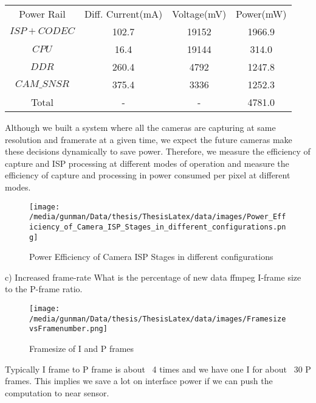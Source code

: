 		\begin{tabular}{c|c|c|c}
			Power Rail  & Diff. Current(mA) & Voltage(mV) & Power(mW)   \\
			$ISP+CODEC$ & 102.7             & 19152       & 1966.9      \\
			$CPU$ & 16.4              & 19144       & 314.0       \\
			$DDR$ & 260.4             & 4792        & 1247.8      \\
			$CAM\_SNSR$ & 375.4             & 3336        & 1252.3      \\
			Total       & -                 & -           & 4781.0      \\
		\end{tabular} \newline
		
		Although we built a system where all the cameras are capturing at same resolution and framerate at a given time, we expect the future cameras make these decisions dynamically to save power. Therefore, we  measure the efficiency of capture and ISP processing at different modes of operation and measure the efficiency of capture and processing in power consumed per pixel at different modes.
		
\begin{figure*}
	\begin{center}
		\texttt{[image: /media/gunman/Data/thesis/ThesisLatex/data/images/Power\_Efficiency\_of\_Camera\_ISP\_Stages\_in\_different\_configurations.png]}
		\caption{Power Efficiency of Camera ISP Stages in different configurations}
		\label{fig:ex_4_9}
	\end{center}
	\vspace{-0.3in}
\end{figure*} 

	c) Increased frame-rate\newline
		What is the percentage of new data
			ffmpeg I-frame size to the P-frame ratio.
			\begin{figure*}
				\begin{center}
					\texttt{[image: /media/gunman/Data/thesis/ThesisLatex/data/images/FramesizevsFramenumber.png]}
					\caption{Framesize of I and P frames}
					\label{fig:ex_4_9}
				\end{center}
				\vspace{-0.3in}
			\end{figure*} 
		Typically I frame to P frame is about ~4 times and we have one I for about ~30 P frames. This implies we save a lot on interface power if we can push the computation to near sensor.  
			
